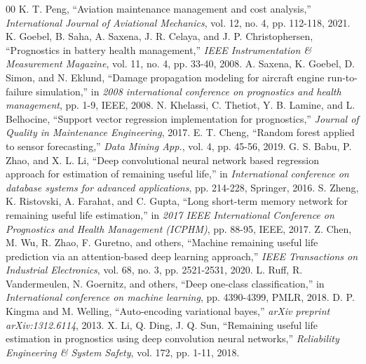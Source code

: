 \documentclass[conference]{IEEEtran}
\begin{document}
\begin{thebibliography}{00}
 K. T. Peng, ``Aviation maintenance management and cost analysis,'' \textit{International Journal of Aviational Mechanics}, vol. 12, no. 4, pp. 112-118, 2021.
 K. Goebel, B. Saha, A. Saxena, J. R. Celaya, and J. P. Christophersen, ``Prognostics in battery health management,'' \textit{IEEE Instrumentation \& Measurement Magazine}, vol. 11, no. 4, pp. 33-40, 2008.
 A. Saxena, K. Goebel, D. Simon, and N. Eklund, ``Damage propagation modeling for aircraft engine run-to-failure simulation,'' in \textit{2008 international conference on prognostics and health management}, pp. 1-9, IEEE, 2008.
 N. Khelassi, C. Thetiot, Y. B. Lamine, and L. Belhocine, ``Support vector regression implementation for prognostics,'' \textit{Journal of Quality in Maintenance Engineering}, 2017.
 E. T. Cheng, ``Random forest applied to sensor forecasting,'' \textit{Data Mining App.}, vol. 4, pp. 45-56, 2019.
 G. S. Babu, P. Zhao, and X. L. Li, ``Deep convolutional neural network based regression approach for estimation of remaining useful life,'' in \textit{International conference on database systems for advanced applications}, pp. 214-228, Springer, 2016.
 S. Zheng, K. Ristovski, A. Farahat, and C. Gupta, ``Long short-term memory network for remaining useful life estimation,'' in \textit{2017 IEEE International Conference on Prognostics and Health Management (ICPHM)}, pp. 88-95, IEEE, 2017.
 Z. Chen, M. Wu, R. Zhao, F. Guretno, and others, ``Machine remaining useful life prediction via an attention-based deep learning approach,'' \textit{IEEE Transactions on Industrial Electronics}, vol. 68, no. 3, pp. 2521-2531, 2020.
 L. Ruff, R. Vandermeulen, N. Goernitz, and others, ``Deep one-class classification,'' in \textit{International conference on machine learning}, pp. 4390-4399, PMLR, 2018.
 D. P. Kingma and M. Welling, ``Auto-encoding variational bayes,'' \textit{arXiv preprint arXiv:1312.6114}, 2013.
 X. Li, Q. Ding, J. Q. Sun, ``Remaining useful life estimation in prognostics using deep convolution neural networks,'' \textit{Reliability Engineering \& System Safety}, vol. 172, pp. 1-11, 2018.
\end{thebibliography}
\vspace{12pt}
\end{document}
